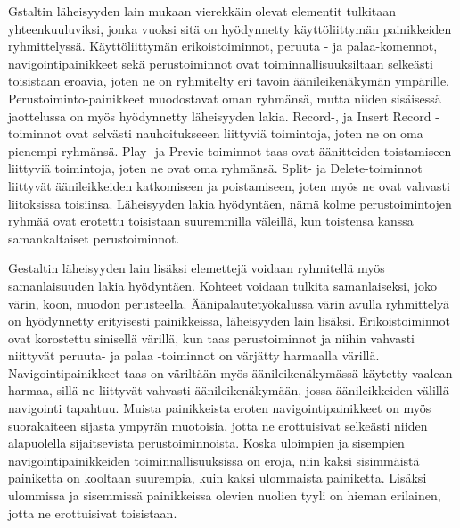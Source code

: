 \documentclass[utf8]{gradu3}
\begin{document}
Gstaltin läheisyyden lain mukaan vierekkäin olevat elementit tulkitaan yhteenkuuluviksi, jonka vuoksi sitä on hyödynnetty käyttöliittymän painikkeiden ryhmittelyssä. Käyttöliittymän erikoistoiminnot, peruuta - ja palaa-komennot, navigointipainikkeet sekä perustoiminnot ovat toiminnallisuuksiltaan selkeästi toisistaan eroavia, joten ne on ryhmitelty eri tavoin äänileikenäkymän ympärille. Perustoiminto-painikkeet muodostavat oman ryhmänsä, mutta niiden sisäisessä jaottelussa on myös hyödynnetty läheisyyden lakia. Record-, ja Insert Record -toiminnot ovat selvästi nauhoitukseeen liittyviä toimintoja, joten ne on oma pienempi ryhmänsä. Play- ja Previe-toiminnot taas ovat äänitteiden toistamiseen liittyviä toimintoja, joten ne ovat oma ryhmänsä. Split- ja Delete-toiminnot liittyvät äänileikkeiden katkomiseen ja poistamiseen, joten myös ne ovat vahvasti liitoksissa toisiinsa. Läheisyyden lakia hyödyntäen, nämä kolme perustoimintojen ryhmää ovat erotettu toisistaan suuremmilla väleillä, kun toistensa kanssa samankaltaiset perustoiminnot. 

Gestaltin läheisyyden lain lisäksi elemettejä voidaan ryhmitellä myös samanlaisuuden lakia hyödyntäen. Kohteet voidaan tulkita samanlaiseksi, joko värin, koon, muodon perusteella. Äänipalautetyökalussa värin avulla ryhmittelyä on hyödynnetty erityisesti painikkeissa, läheisyyden lain lisäksi. Erikoistoiminnot ovat korostettu sinisellä värillä, kun taas perustoiminnot ja niihin vahvasti niittyvät peruuta- ja palaa -toiminnot on värjätty harmaalla värillä. Navigointipainikkeet taas on väriltään myös äänileikenäkymässä käytetty vaalean harmaa, sillä ne liittyvät vahvasti äänileikenäkymään, jossa äänileikkeiden välillä navigointi tapahtuu. Muista painikkeista eroten navigointipainikkeet on myös suorakaiteen sijasta ympyrän muotoisia, jotta ne erottuisivat selkeästi niiden alapuolella sijaitsevista perustoiminnoista. Koska uloimpien ja sisempien navigointipainikkeiden toiminnallisuuksissa on eroja, niin kaksi sisimmäistä painiketta on kooltaan suurempia, kuin kaksi ulommaista painiketta. Lisäksi ulommissa ja sisemmissä painikkeissa olevien nuolien tyyli on hieman erilainen, jotta ne erottuisivat toisistaan.
\end{document}
